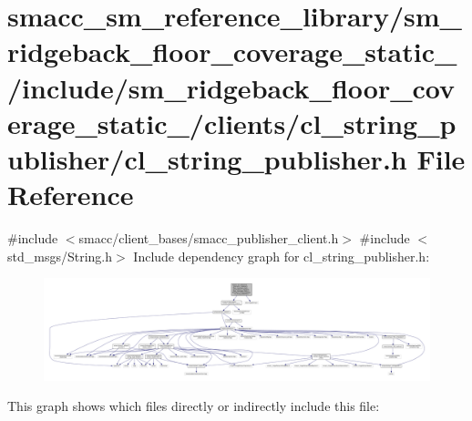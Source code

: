 \hypertarget{sm__ridgeback__floor__coverage__static__1_2include_2sm__ridgeback__floor__coverage__static__1_2cb2febaddf68c38df7b977ac0d59a02b6}{}\section{smacc\+\_\+sm\+\_\+reference\+\_\+library/sm\+\_\+ridgeback\+\_\+floor\+\_\+coverage\+\_\+static\+\_/include/sm\+\_\+ridgeback\+\_\+floor\+\_\+coverage\+\_\+static\+\_/clients/cl\+\_\+string\+\_\+publisher/cl\+\_\+string\+\_\+publisher.h File Reference}
\label{sm__ridgeback__floor__coverage__static__1_2include_2sm__ridgeback__floor__coverage__static__1_2cb2febaddf68c38df7b977ac0d59a02b6}
{\ttfamily \#include $<$smacc/client\+\_\+bases/smacc\+\_\+publisher\+\_\+client.\+h$>$}\newline
{\ttfamily \#include $<$std\+\_\+msgs/\+String.\+h$>$}\newline
Include dependency graph for cl\+\_\+string\+\_\+publisher.\+h\+:
\nopagebreak
\begin{figure}[H]
\begin{center}
\leavevmode
\includegraphics[width=350pt]{sm__ridgeback__floor__coverage__static__1_2include_2sm__ridgeback__floor__coverage__static__1_2c88e397d16d21e4081e953d5b03a6a704}
\end{center}
\end{figure}
This graph shows which files directly or indirectly include this file\+:
\nopagebreak
